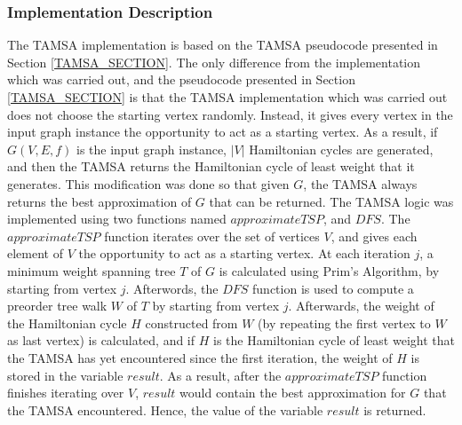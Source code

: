 \documentclass{article}
\begin{document}
\subsubsection{Implementation Description}
\label{TAMSA_impl}
The TAMSA implementation is based on the TAMSA pseudocode presented in Section \ref{TAMSA_SECTION}. The only difference from the implementation which was carried out, and the pseudocode presented in Section \ref{TAMSA_SECTION} is that the TAMSA implementation which was carried out does not choose the starting vertex randomly. Instead, it gives every vertex in the input graph instance the opportunity to act as a starting vertex. As a result, if $G(V,E,f)$ is the input graph instance, $|V|$ Hamiltonian cycles are generated, and then the TAMSA returns the Hamiltonian cycle of least weight that it generates. This modification was done so that given $G$, the TAMSA always returns the best approximation of $G$ that can be returned. The TAMSA logic was implemented using two functions named $approximateTSP$, and $DFS$. The $approximateTSP$ function iterates over the set of vertices $V$, and gives each element of $V$ the opportunity to act as a starting vertex. At each iteration $j$, a minimum weight spanning tree $T$ of $G$ is calculated using Prim's Algorithm, by starting from vertex $j$. Afterwords, the $DFS$ function is used to compute a preorder tree walk $W$ of $T$ by starting from vertex $j$. Afterwards, the weight of the Hamiltonian cycle $H$ constructed from $W$ (by repeating the first vertex to $W$ as last vertex) is calculated, and if $H$ is the Hamiltonian cycle of least weight that the TAMSA has yet encountered since the first iteration, the weight of $H$ is stored in the variable $result$. As a result, after the $approximateTSP$ function finishes iterating over $V$, $result$ would contain the best approximation for $G$ that the TAMSA encountered. Hence, the value of the variable $result$ is returned.    \\\\
\end{document}
